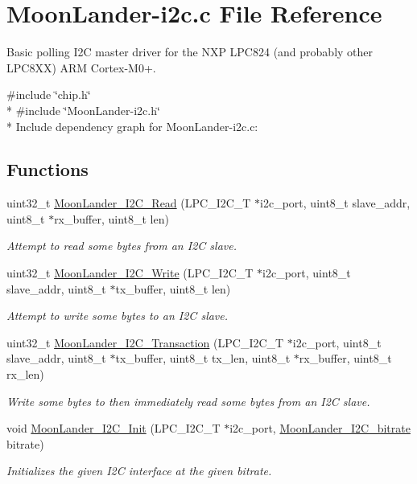 \hypertarget{MoonLander-i2c_8c}{}\section{Moon\+Lander-\/i2c.c File Reference}
\label{MoonLander-i2c_8c}


Basic polling I2C master driver for the N\+XP L\+P\+C824 (and probably other L\+P\+C8\+XX) A\+RM Cortex-\/\+M0+.  


{\ttfamily \#include \char`\"{}chip.\+h\char`\"{}}\\*
{\ttfamily \#include \char`\"{}Moon\+Lander-\/i2c.\+h\char`\"{}}\\*
Include dependency graph for Moon\+Lander-\/i2c.c\+:
\subsection*{Functions}
\begin{DoxyCompactItemize}
\item 
uint32\+\_\+t \hyperlink{MoonLander-i2c_8c_a198617ba51109894385bb0ee640fce3d}{Moon\+Lander\+\_\+\+I2\+C\+\_\+\+Read} (L\+P\+C\+\_\+\+I2\+C\+\_\+T $\ast$i2c\+\_\+port, uint8\+\_\+t slave\+\_\+addr, uint8\+\_\+t $\ast$rx\+\_\+buffer, uint8\+\_\+t len)
\begin{DoxyCompactList}\small\item\em Attempt to read some bytes from an I2C slave. \end{DoxyCompactList}\item 
uint32\+\_\+t \hyperlink{MoonLander-i2c_8c_afc446bc861639e8c9fb073cad69f34d1}{Moon\+Lander\+\_\+\+I2\+C\+\_\+\+Write} (L\+P\+C\+\_\+\+I2\+C\+\_\+T $\ast$i2c\+\_\+port, uint8\+\_\+t slave\+\_\+addr, uint8\+\_\+t $\ast$tx\+\_\+buffer, uint8\+\_\+t len)
\begin{DoxyCompactList}\small\item\em Attempt to write some bytes to an I2C slave. \end{DoxyCompactList}\item 
uint32\+\_\+t \hyperlink{MoonLander-i2c_8c_aa736d66b137e59b64d8b1b1a85c4cd8b}{Moon\+Lander\+\_\+\+I2\+C\+\_\+\+Transaction} (L\+P\+C\+\_\+\+I2\+C\+\_\+T $\ast$i2c\+\_\+port, uint8\+\_\+t slave\+\_\+addr, uint8\+\_\+t $\ast$tx\+\_\+buffer, uint8\+\_\+t tx\+\_\+len, uint8\+\_\+t $\ast$rx\+\_\+buffer, uint8\+\_\+t rx\+\_\+len)
\begin{DoxyCompactList}\small\item\em Write some bytes to then immediately read some bytes from an I2C slave. \end{DoxyCompactList}\item 
void \hyperlink{MoonLander-i2c_8c_aa8b0b475cb2a4860cb5d6c4a13895129}{Moon\+Lander\+\_\+\+I2\+C\+\_\+\+Init} (L\+P\+C\+\_\+\+I2\+C\+\_\+T $\ast$i2c\+\_\+port, \hyperlink{MoonLander-i2c_8h_a99b692076d07b714e6b130bdc715e3ee}{Moon\+Lander\+\_\+\+I2\+C\+\_\+bitrate} bitrate)
\begin{DoxyCompactList}\small\item\em Initializes the given I2C interface at the given bitrate. \end{DoxyCompactList}\end{DoxyCompactItemize}


